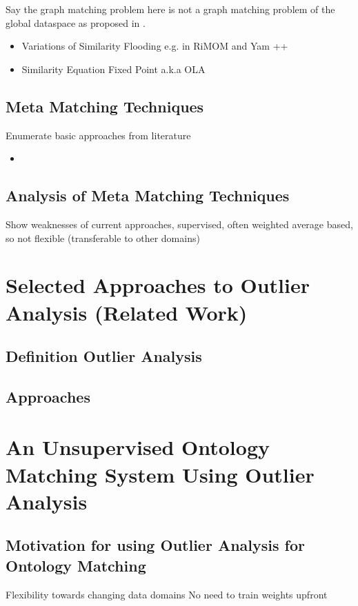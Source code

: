 \documentclass[11pt,titlepage,oneside,openany,a4paper]{report}
\begin{document}
Say the graph matching problem here is not a graph matching problem of the global dataspace as proposed in \cite{JoslynPW08}.	
	
\begin{itemize}
	\item Variations of Similarity Flooding \cite{Melnik:2002} e.g. in RiMOM and Yam ++
	\item Similarity Equation Fixed Point a.k.a OLA  \cite{EuzenatV04}
\end{itemize}
\section{Meta Matching Techniques}
Enumerate basic approaches from literature

\begin{itemize}
\item 
\end{itemize}

\section{Analysis of Meta Matching Techniques}
Show weaknesses of current approaches, supervised, often weighted average based, so not flexible (transferable to other domains)

\chapter{Selected Approaches to Outlier Analysis (Related Work)}
\section{Definition Outlier Analysis}
\section{Approaches}


\chapter{An Unsupervised Ontology Matching System Using Outlier Analysis}
\section{Motivation for using Outlier Analysis for Ontology Matching}
Flexibility towards changing data domains
No need to train weights upfront
\end{document}

